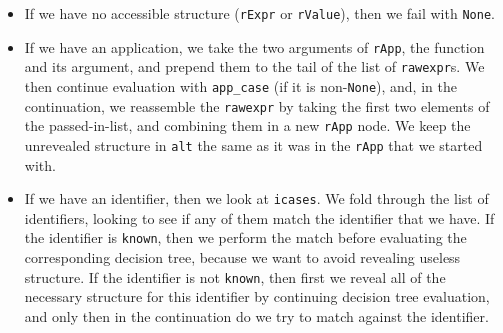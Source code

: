 \documentclass[
]{article}
\providecommand{\tightlist}{%
  \setlength{\itemsep}{0pt}\setlength{\parskip}{0pt}}
\begin{document}
\begin{itemize}
\begin{itemize}
\begin{itemize}
\begin{itemize}
        \begin{itemize}
        \tightlist
        \item
          If we have no accessible structure (\texttt{rExpr} or
          \texttt{rValue}), then we fail with \texttt{None}.
        \item
          If we have an application, we take the two arguments of
          \texttt{rApp}, the function and its argument, and prepend them
          to the tail of the list of \texttt{rawexpr}s. We then continue
          evaluation with \texttt{app\_case} (if it is
          non-\texttt{None}), and, in the continuation, we reassemble
          the \texttt{rawexpr} by taking the first two elements of the
          passed-in-list, and combining them in a new \texttt{rApp}
          node. We keep the unrevealed structure in \texttt{alt} the
          same as it was in the \texttt{rApp} that we started with.
        \item
          If we have an identifier, then we look at \texttt{icases}. We
          fold through the list of identifiers, looking to see if any of
          them match the identifier that we have. If the identifier is
          \texttt{known}, then we perform the match before evaluating
          the corresponding decision tree, because we want to avoid
          revealing useless structure. If the identifier is not
          \texttt{known}, then first we reveal all of the necessary
          structure for this identifier by continuing decision tree
          evaluation, and only then in the continuation do we try to
          match against the identifier.


\end{itemize}
\end{itemize}
\end{itemize}
\end{itemize}
\end{itemize}
\end{document}

